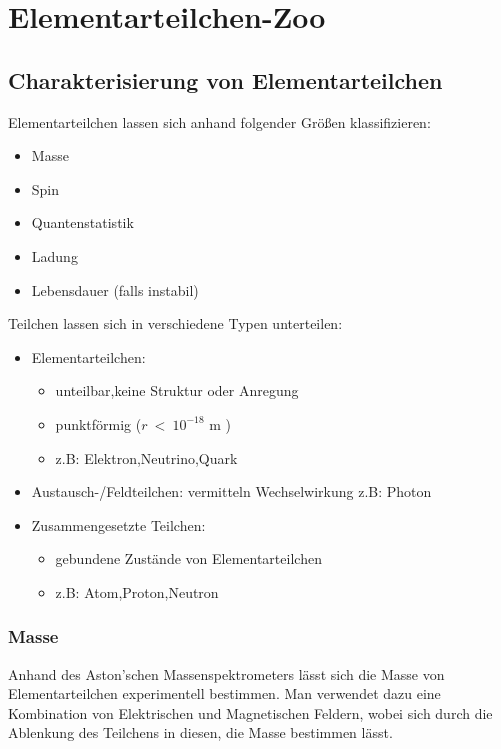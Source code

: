 \documentclass[Ex4_Zusammenfassung.tex]{subfiles}
\begin{document}
\chapter{Elementarteilchen-Zoo}	
\section{Charakterisierung von Elementarteilchen}
Elementarteilchen lassen sich anhand folgender Größen klassifizieren:
\begin{itemize}
\item Masse
\item Spin
\item Quantenstatistik
\item Ladung
\item Lebensdauer (falls instabil)
\end{itemize}
Teilchen lassen sich  in verschiedene Typen unterteilen: 
\begin{itemize}
\item Elementarteilchen: \begin{itemize}
						\item unteilbar,keine Struktur oder Anregung
						\item punktförmig ($ r \ < \ 10^{-18} $ m )
						\item z.B: Elektron,Neutrino,Quark
						\end{itemize}
\item Austausch-/Feldteilchen: vermitteln Wechselwirkung z.B: Photon
\item Zusammengesetzte Teilchen: \begin{itemize}
						\item gebundene Zustände von Elementarteilchen
						\item z.B: Atom,Proton,Neutron
								\end{itemize}
\end{itemize} \newpage
\subsection{Masse}
Anhand des Aston'schen Massenspektrometers lässt sich die Masse von Elementarteilchen experimentell bestimmen. 
Man verwendet dazu eine Kombination von Elektrischen und Magnetischen Feldern, wobei sich durch die Ablenkung des Teilchens in diesen, die Masse bestimmen lässt. 
\end{document}
